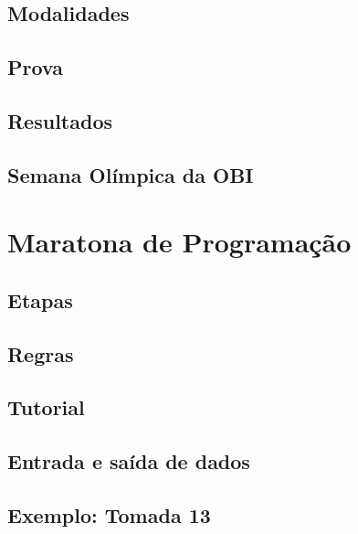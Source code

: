 \documentclass[utf8, usepdftitle=false, svgnames, color={table, fixpdftex, hyperref, fixinclude, xcdraw}, t, brazil]{beamer}
\begin{document}
			\subsection{Modalidades}
			

			\subsection{Prova}
			

			\subsection{Resultados}
			

			\subsection{Semana Olímpica da OBI}
			



		\section[ICPC]{Maratona de Programação}
		

			\subsection{Etapas}
			

			\subsection{Regras}
			

			\subsection{Tutorial}
			

			\subsection{Entrada e saída de dados}
			

			\subsection{Exemplo: Tomada 13}
			
\end{document}
